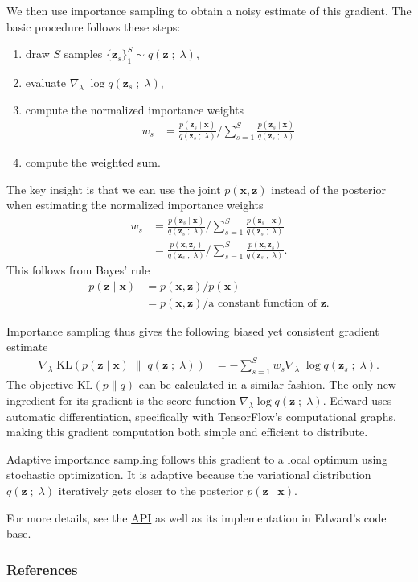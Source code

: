 We then use importance sampling to obtain a noisy estimate of this gradient.
The basic procedure follows these steps:
\begin{enumerate}
  \item draw $S$ samples $\{\mathbf{z}_s\}_1^S \sim q(\mathbf{z}\;;\;\lambda)$,
  \item evaluate $\nabla_\lambda\; \log q(\mathbf{z}_s\;;\;\lambda)$,
  \item compute the normalized importance weights
  \begin{align*}
    w_s
    &=
    \frac{p(\mathbf{z}_s \mid \mathbf{x})}{q(\mathbf{z}_s\;;\;\lambda)}
    \Bigg/
    \sum_{s=1}^{S}
    \frac{p(\mathbf{z}_s \mid \mathbf{x})}{q(\mathbf{z}_s\;;\;\lambda)}
  \end{align*}
  \item compute the weighted sum.
\end{enumerate}
The key insight is that we can use the joint $p(\mathbf{x},\mathbf{z})$ instead of the posterior
when estimating the normalized importance weights
\begin{align*}
  w_s
  &=
  \frac{p(\mathbf{z}_s \mid \mathbf{x})}{q(\mathbf{z}_s\;;\;\lambda)}
  \Bigg/
  \sum_{s=1}^{S}
  \frac{p(\mathbf{z}_s \mid \mathbf{x})}{q(\mathbf{z}_s\;;\;\lambda)} \\
  &=
  \frac{p(\mathbf{x}, \mathbf{z}_s)}{q(\mathbf{z}_s\;;\;\lambda)}
  \Bigg/
  \sum_{s=1}^{S}
  \frac{p(\mathbf{x}, \mathbf{z}_s)}{q(\mathbf{z}_s\;;\;\lambda)}.
\end{align*}
This follows from Bayes' rule
\begin{align*}
  p(\mathbf{z} \mid \mathbf{x})
  &=
  p(\mathbf{x}, \mathbf{z}) / p(\mathbf{x})\\
  &=
  p(\mathbf{x}, \mathbf{z}) / \text{a constant function of }\mathbf{z}.
\end{align*}

Importance sampling thus gives the following biased yet consistent gradient
estimate
\begin{align*}
\nabla_\lambda\;
  \text{KL}(
  p(\mathbf{z} \mid \mathbf{x})
  \;\|\;
  q(\mathbf{z}\;;\;\lambda)
  )
  &=
  -
  \sum_{s=1}^S
  w_s
  \nabla_\lambda\; \log q(\mathbf{z}_s\;;\;\lambda).
\end{align*}
The objective $\text{KL}(p\|q)$ can be calculated in a similar fashion.
The only new ingredient for its gradient is the score function
$\nabla_\lambda \log q(\mathbf{z}\;;\;\lambda)$.  Edward uses automatic
differentiation, specifically with TensorFlow's computational graphs,
making this gradient computation both simple and efficient to
distribute.

Adaptive importance sampling follows this gradient to a local optimum using
stochastic optimization. It is adaptive because the variational distribution
$q(\mathbf{z}\;;\;\lambda)$ iteratively gets closer to the posterior $p(\mathbf{z} \mid \mathbf{x})$.

For more details, see the \href{/api/}{API} as well as its
implementation in Edward's code base.

\subsubsection{References}\label{references}
